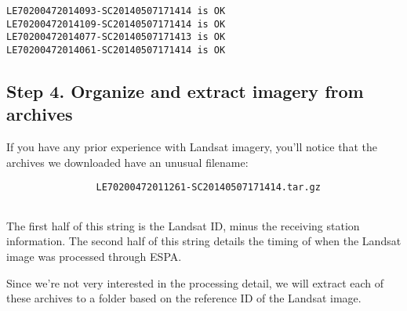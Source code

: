 \documentclass{article}
\begin{document}
    \begin{Verbatim}[commandchars=\\\{\}]
LE70200472014093-SC20140507171414 is OK
LE70200472014109-SC20140507171414 is OK
LE70200472014077-SC20140507171413 is OK
LE70200472014061-SC20140507171414 is OK
    \end{Verbatim}

    \subsection{Step 4. Organize and extract imagery from archives}

If you have any prior experience with Landsat imagery, you'll notice
that the archives we downloaded have an unusual filename:

\begin{verbatim}
                LE70200472011261-SC20140507171414.tar.gz
                
\end{verbatim}

The first half of this string is the Landsat ID, minus the receiving
station information. The second half of this string details the timing
of when the Landsat image was processed through ESPA.

Since we're not very interested in the processing detail, we will
extract each of these archives to a folder based on the reference ID of
the Landsat image.
\end{document}
